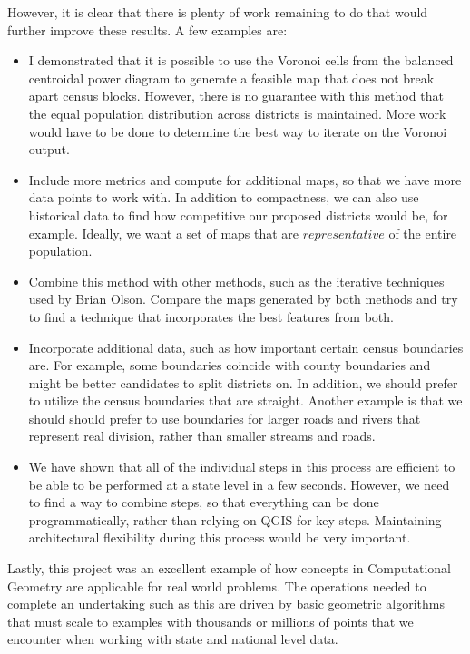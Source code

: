 \documentclass[11pt]{article}
\begin{document}
However, it is clear that there is plenty of work remaining to do that would further improve these results. A few examples are:
\begin{itemize}
	\item I demonstrated that it is possible to use the Voronoi cells from the balanced centroidal power diagram to generate a feasible map that does not break apart census blocks. However, there is no guarantee with this method that the equal population distribution across districts is maintained. More work would have to be done to determine the best way to iterate on the Voronoi output.
	\item Include more metrics and compute for additional maps, so that we have more data points to work with. In addition to compactness, we can also use historical data to find how competitive our proposed districts would be, for example. Ideally, we want a set of maps that are $representative$ of the entire population.
	\item Combine this method with other methods, such as the iterative techniques used by Brian Olson. Compare the maps generated by both methods and try to find a technique that incorporates the best features from both.
	\item Incorporate additional data, such as how important certain census boundaries are. For example, some boundaries coincide with county boundaries and might be better candidates to split districts on. In addition, we should prefer to utilize the census boundaries that are straight. Another example is that we should should prefer to use boundaries for larger roads and rivers that represent real division, rather than smaller streams and roads.
	\item We have shown that all of the individual steps in this process are efficient to be able to be performed at a state level in a few seconds. However, we need to find a way to combine steps, so that everything can be done programmatically, rather than relying on QGIS for key steps. Maintaining architectural flexibility during this process would be very important.
\end{itemize}

Lastly, this project was an excellent example of how concepts in Computational Geometry are applicable for real world problems. The operations needed to complete an undertaking such as this are driven by basic geometric algorithms that must scale to examples with thousands or millions of points that we encounter when working with state and national level data.



\end{document}

